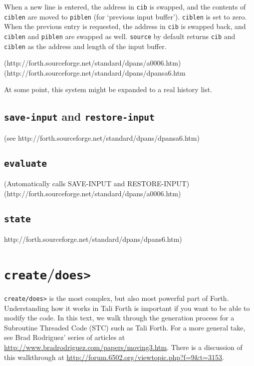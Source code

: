 When a new line is entered, the address in \texttt{cib} is swapped, and the
contents of \texttt{ciblen} are moved to \texttt{piblen} (for `previous input
buffer'). \texttt{ciblen} is set to zero.  When the previous entry is
requested, the address in \texttt{cib} is swapped back, and \texttt{ciblen} and
\texttt{piblen} are swapped as well. \texttt{source} by default returns
\texttt{cib} and \texttt{ciblen} as the address and length of the input buffer. 

(http://forth.sourceforge.net/standard/dpans/a0006.htm)
(http://forth.sourceforge.net/standard/dpans/dpansa6.htm

At some point, this system might be expanded to a real history
list.


\subsection{\texttt{save-input} and \texttt{restore-input}}

(see http://forth.sourceforge.net/standard/dpans/dpansa6.htm)



\subsection{\texttt{evaluate}}

(Automatically calls SAVE-INPUT and RESTORE-INPUT)
(http://forth.sourceforge.net/standard/dpans/a0006.htm)


\subsection{\texttt{state}}

http://forth.sourceforge.net/standard/dpans/dpans6.htm)



\section{\texttt{create}/\texttt{does>}}

\texttt{create/does>} is the most complex, but also most powerful part of Forth.
Understanding how it works in Tali Forth is important if you want to be able to
modify the code. In this text, we walk through the generation process for a
Subroutine Threaded Code (STC) such as Tali Forth. For a more general take, see
Brad Rodriguez' series of articles at
\href{http://www.bradrodriguez.com/papers/moving3.htm}{http://www.bradrodriguez.com/papers/moving3.htm}.
There is a discussion of this walkthrough at
\href{http://forum.6502.org/viewtopic.php?f=9\&t=3153}{http://forum.6502.org/viewtopic.php?f=9\&t=3153}. 

